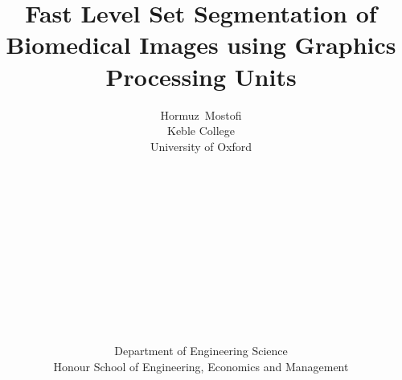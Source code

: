 \documentclass[a4paper,oneside,11pt]{book}
\begin{document}
\frontmatter
\title{Fast Level Set Segmentation of Biomedical Images using Graphics Processing Units}
\author{Hormuz~Mostofi \\ Keble College\\ University of Oxford \\ \\ \\ \\\\\\\\\\\\\\\\\ \\ \\Department of Engineering Science  \\ Honour School of Engineering, Economics and Management}
\maketitle




\setcounter{tocdepth}{1}
\begin{spacing}{1.2}
\tableofcontents
\end{spacing}

\mainmatter






\begin{spacing}{1.2}
\nocite{3dfinitedifference}\nocite{brainweb}\nocite{chan2001acw}\nocite{cuda}\nocite{difi}\nocite{gist}\nocite{goodman}\nocite{gpgpudistance}\nocite{gui2005lse}\nocite{ibanez:isg}\nocite{kharlamov:id}\nocite{klar:igb}\nocite{Lefohn04astreaming}\nocite{mgiles}\nocite{narrowband}\nocite{nvidia2008cud}\nocite{osher2003lsm}\nocite{oshersethian}\nocite{rumpf2001lss}\nocite{sethian2003lsm}\nocite{sharma17cbl}\nocite{sparsefield}\nocite{nguyen2007gg}


\end{spacing}




\begin{spacing}{1.18}


\end{spacing}
\end{document}
